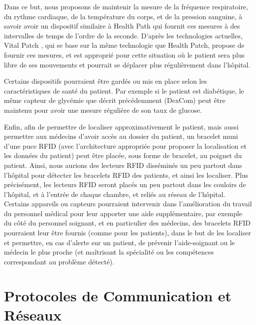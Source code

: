 \documentclass{article}
\begin{document}
Dans ce but, nous proposons de maintenir la mesure de la fréquence respiratoire, du rythme cardiaque, de la température du corps, et de la pression sanguine, à savoir avoir un dispositif similaire à Health Path qui fournit ces mesures à des intervalles de temps de l'ordre de la seconde. D’après les technologies actuelles, Vital Patch \cite{VitalPatch}, qui se base sur la même technologie que Health Patch, propose de fournir ces mesures, et est approprié pour cette situation où le patient sera plus libre de ses mouvements et pourrait se déplacer plus régulièrement dans l’hôpital.

Certains dispositifs pourraient être gardés ou mis en place selon les caractéristiques de santé du patient. Par exemple si le patient est diabétique, le même capteur de glycémie que décrit précédemment (DexCom) peut être maintenu pour avoir une mesure régulière de son taux de glucose.

Enfin, afin de permettre de localiser approximativement le patient, mais aussi permettre aux médecins d’avoir accès au dossier du patient, un bracelet muni d’une puce RFID (avec l’architecture appropriée pour proposer la localisation et les données du patient) peut être placée, sous forme de bracelet, au poignet du patient. Ainsi, nous aurions des lecteurs RFID disséminés un peu partout dans l’hôpital pour détecter les bracelets RFID des patients, et ainsi les localiser. Plus précisément, les lecteurs RFID seront placés un peu partout dans les couloirs de l’hôpital, et à l’entrée de chaque chambre, et reliés au réseau de l'hôpital.
\\

Certains appareils ou capteurs pourraient intervenir dans l'amélioration du travail du personnel médical pour leur apporter une aide supplémentaire, par exemple du côté du personnel soignant, et en particulier des médecins, des bracelets RFID \cite{BraceletRFID} pourraient leur être fournis (comme pour les patients), dans le but de les localiser et permettre, en cas d’alerte sur un patient, de prévenir l’aide-soignant ou le médecin le plus proche (et maîtrisant la spécialité ou les compétences correspondant au problème détecté).

\section {Protocoles de Communication et Réseaux}
\end{document}
